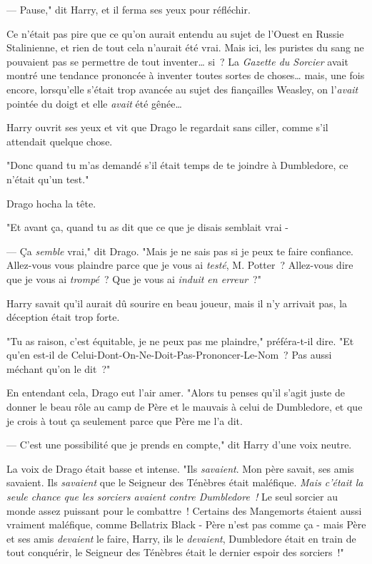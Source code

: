 --- Pause," dit Harry, et il ferma ses yeux pour réfléchir.

Ce n'était pas pire que ce qu'on aurait entendu au sujet de l'Ouest en Russie Stalinienne, et rien de tout cela n'aurait été vrai. Mais ici, les puristes du sang ne pouvaient pas se permettre de tout inventer… si~? La \emph{Gazette du Sorcier} avait montré une tendance prononcée à inventer toutes sortes de choses… mais, une fois encore, lorsqu'elle s'était trop avancée au sujet des fiançailles Weasley, on l'\emph{avait} pointée du doigt et elle \emph{avait} été gênée…

Harry ouvrit ses yeux et vit que Drago le regardait sans ciller, comme s'il attendait quelque chose.

"Donc quand tu m'as demandé s'il était temps de te joindre à Dumbledore, ce n'était qu'un test."

Drago hocha la tête.

"Et avant ça, quand tu as dit que ce que je disais semblait vrai -

--- Ça \emph{semble} vrai," dit Drago. "Mais je ne sais pas si je peux te faire confiance. Allez-vous vous plaindre parce que je vous ai \emph{testé}, M. Potter~? Allez-vous dire que je vous ai \emph{trompé}~? Que je vous ai \emph{induit en erreur}~?"

Harry savait qu'il aurait dû sourire en beau joueur, mais il n'y arrivait pas, la déception était trop forte.

"Tu as raison, c'est équitable, je ne peux pas me plaindre," préféra-t-il dire. "Et qu'en est-il de Celui-Dont-On-Ne-Doit-Pas-Prononcer-Le-Nom~? Pas aussi méchant qu'on le dit~?"

En entendant cela, Drago eut l'air amer. "Alors tu penses qu'il s'agit juste de donner le beau rôle au camp de Père et le mauvais à celui de Dumbledore, et que je crois à tout ça seulement parce que Père me l'a dit.

--- C'est une possibilité que je prends en compte," dit Harry d'une voix neutre.

La voix de Drago était basse et intense. "Ils \emph{savaient}. Mon père savait, ses amis savaient. Ils \emph{savaient} que le Seigneur des Ténèbres était maléfique. \emph{Mais c'était la seule chance que les sorciers avaient contre Dumbledore~!} Le seul sorcier au monde assez puissant pour le combattre~! Certains des Mangemorts étaient aussi vraiment maléfique, comme Bellatrix Black - Père n'est pas comme ça - mais Père et ses amis \emph{devaient} le faire, Harry, ils le \emph{devaient}, Dumbledore était en train de tout conquérir, le Seigneur des Ténèbres était le dernier espoir des sorciers~!"


